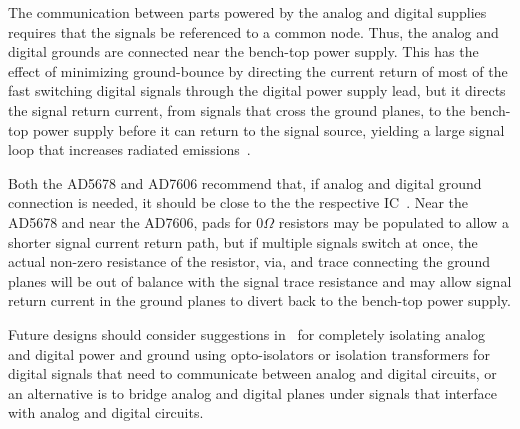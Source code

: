 The communication between parts powered by the analog and digital supplies requires that the signals be referenced to a common node.  Thus, the analog and digital grounds are connected near the bench-top power supply.  This has the effect of minimizing ground-bounce by directing the current return of most of the fast switching digital signals through the digital power supply lead, but it directs the signal return current, from signals that cross the ground planes, to the bench-top power supply before it can return to the signal source, yielding a large signal loop that increases radiated emissions~\cite{Montrose1999}.

Both the AD5678 and AD7606 recommend that, if analog and digital ground connection is needed, it should be close to the the respective IC~\cite{AD7606ds,AD5678ds}.  Near the AD5678 and near the AD7606, pads for $0\unit{\Omega}$ resistors may be populated to allow a shorter signal current return path, but if multiple signals switch at once, the actual non-zero resistance of the resistor, via, and trace connecting the ground planes will be out of balance with the signal trace resistance and may allow signal return current in the ground planes to divert back to the bench-top power supply.

Future designs should consider suggestions in~\cite{Montrose1999} for completely isolating analog and digital power and ground using opto-isolators or isolation transformers for digital signals that need to communicate between analog and digital circuits, or an alternative is to bridge analog and digital planes under signals that interface with analog and digital circuits.
